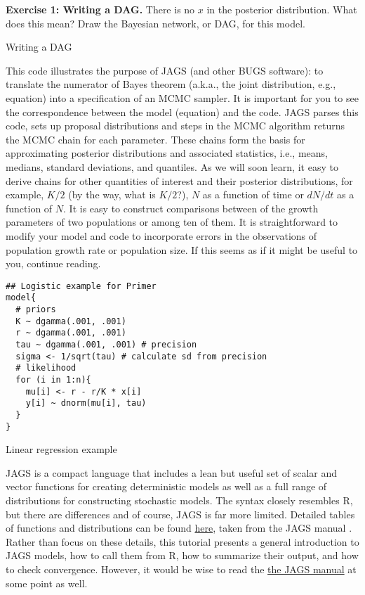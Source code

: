 \documentclass[12pt,english]{article}
\begin{document}
\bigskip
\belowcaptionskip=-40pt
\begin{exercise}
\begin{mdframed}
\doublespacing
\textbf{Exercise 1: Writing a DAG.} There is no $x$ in the posterior distribution. What does this mean? Draw the Bayesian network, or DAG, for this model.
\end{mdframed}
\captionsetup{textformat=empty, labelformat=empty}
\caption{Writing a DAG}
\label{ex:DAG}
\end{exercise}
\belowcaptionskip=0pt

This code illustrates the purpose of JAGS (and other BUGS software): to translate the numerator of Bayes theorem (a.k.a., the joint distribution, e.g., equation) into a specification of an MCMC sampler. It is important for you to see the correspondence between the model (equation) and the code. JAGS parses this code, sets up proposal distributions and steps in the MCMC algorithm returns the MCMC chain for each parameter. These chains form the basis for approximating posterior distributions and associated statistics, i.e., means, medians, standard deviations, and quantiles. As we will soon learn, it easy to derive chains for other quantities of interest and their posterior distributions, for example, $K/2$ (by the way, what is $K/2$?), $N$ as a function of time or $dN/dt$ as a function of $N$. It is easy to construct comparisons between of the growth parameters of two populations or among ten of them. It is straightforward to modify your model and code to incorporate errors in the observations of population growth rate or population size. If this seems as if it might be useful to you, continue reading. 

\begin{algorithm}
\begin{Verbatim}[frame=single]
## Logistic example for Primer
model{
  # priors
  K ~ dgamma(.001, .001)
  r ~ dgamma(.001, .001)
  tau ~ dgamma(.001, .001) # precision
  sigma <- 1/sqrt(tau) # calculate sd from precision
  # likelihood
  for (i in 1:n){
    mu[i] <- r - r/K * x[i]
    y[i] ~ dnorm(mu[i], tau)
  }
}
\end{Verbatim}
\caption{Linear regression example}
\label{alg:Linear regression example}
\end{algorithm}

JAGS is a compact language that includes a lean but useful set of scalar and vector functions for creating deterministic models as well as a full range of distributions for constructing stochastic models. The syntax closely resembles R, but there are differences and of course, JAGS is far more limited. Detailed tables of functions and distributions can be found \href{JAGSUserManualPages.pdf}{here}, taken from the JAGS manual \citep{Plummer_mannual}. Rather than focus on these details, this tutorial presents a general introduction to JAGS models, how to call them from R, how to summarize their output, and how to check convergence. However, it would be wise to read the \href{https://sourceforge.net/projects/mcmc-jags/files/Manuals/4.x/}{the JAGS manual} at some point as well.
\end{document}
